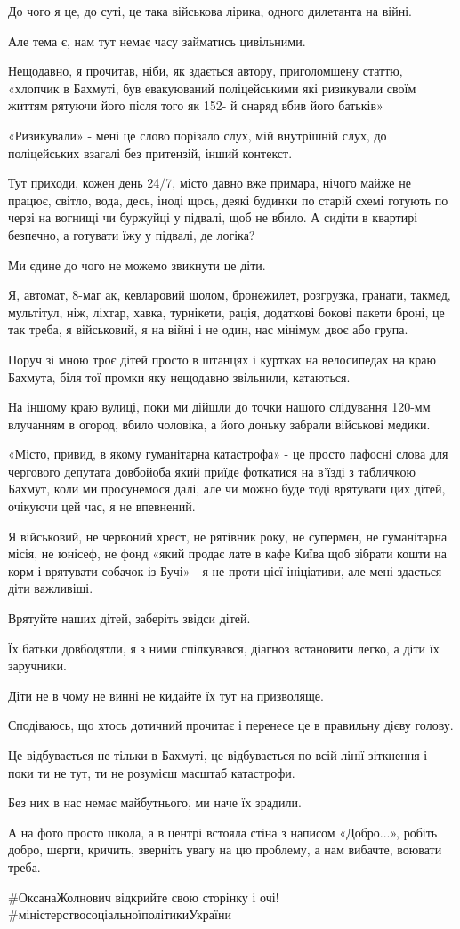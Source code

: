До чого я це, до суті, це така військова лірика, одного дилетанта на війні.

Але тема є, нам тут немає часу займатись цивільними. 

Нещодавно, я прочитав, ніби, як здається автору, приголомшену статтю, «хлопчик
в Бахмуті, був евакуюваний поліцейськими які ризикували своїм життям рятуючи
його після того як 152- й снаряд вбив його батьків»

«Ризикували» -  мені це слово порізало слух, мій внутрішній слух, до
поліцейських взагалі без притензій, інший контекст.

Тут приходи, кожен день 24/7, місто давно вже примара, нічого майже не
працює, світло, вода, десь, іноді щось, деякі будинки по старій схемі готують
по черзі на вогнищі чи буржуйці у підвалі, щоб не вбило. А сидіти в квартирі
безпечно, а готувати їжу у підвалі, де логіка?

Ми єдине до чого не можемо звикнути це діти.

Я, автомат, 8-маг ак, кевларовий шолом, бронежилет, розгрузка, гранати, такмед,
мультітул, ніж, ліхтар, хавка, турнікети, рація, додаткові бокові пакети броні,
це так треба, я військовий, я на війні і не один, нас мінімум двоє або група.

Поруч зі мною троє дітей просто в штанцях і куртках на велосипедах на краю
Бахмута, біля тої промки яку нещодавно звільнили, катаються.

На іншому краю вулиці, поки ми дійшли до точки нашого слідування 120-мм
влучанням в огород, вбило чоловіка, а його доньку забрали військові медики.

«Місто, привид, в якому гуманітарна катастрофа» - це просто пафосні слова для
чергового депутата довбойоба який приїде фоткатися на в’їзді з табличкою
Бахмут, коли ми просунемося далі, але чи можно буде тоді врятувати цих дітей,
очікуючи цей час, я не впевнений. 

Я військовий, не червоний хрест, не рятівник року, не супермен, не
гуманітарна місія, не юнісеф, не фонд «який продає лате в кафе Київа щоб
зібрати кошти на корм і врятувати собачок із Бучі» - я не проти цієї
ініціативи, але мені здається діти важливіші.

Врятуйте наших дітей, заберіть звідси дітей.

Їх батьки довбодятли, я з ними спілкувався, діагноз встановити легко, а діти їх
заручники.

Діти не в чому не винні не кидайте їх тут на призволяще. 

Сподіваюсь, що хтось дотичний прочитає і перенесе це в правильну дієву голову.

Це відбувається не тільки в Бахмуті, це відбувається по всій лінії зіткнення
і поки ти не тут, ти не розумієш масштаб катастрофи.

Без них в нас немає майбутнього, ми наче їх зрадили. 

А на фото просто школа, а в центрі встояла стіна з написом «Добро...», робіть
добро, шерти, кричить, зверніть увагу на цю проблему, а нам вибачте, воювати
треба.

\#ОксанаЖолнович відкрийте свою сторінку і очі!
\#міністерствосоціальноїполітикиУкраїни
